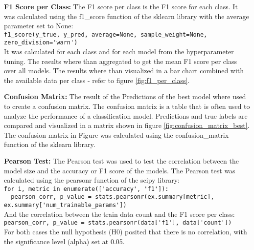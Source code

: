 \textbf{F1 Score per Class:} The F1 score per class is the F1 score for each class. It was calculated
using the f1\_score function of the sklearn library with the average parameter set to None:\\
\lstinline{f1_score(y_true, y_pred, average=None, sample_weight=None, zero_division='warn')}\\
It was calculated for each class and for each model from the hyperparameter tuning. The results
where than aggregated to get the mean F1 score per class over all models. The results where
than visualized in a bar chart combined with the available data per class - refer to
figure \ref{fig:f1_per_class}.

\textbf{Confusion Matrix:} The result of the Predictions of the best model where used to create a confusion matrix.
The confusion matrix is a table that is often used to analyze the performance of a classification model.
Predictions and true labels are compared and visualized in a matrix shown in figure \ref{fig:confusion_matrix_best}. 
The confusion matrix in Figure was calculated using the confusion\_matrix function of the sklearn library.

\textbf{Pearson Test:} The Pearson test was used to test the correlation between the model size and the accuracy
or F1 score of the models. The Pearson test was calculated using the pearsonr function of the scipy library:\\
\lstinline{for i, metric in enumerate(['accuracy', 'f1']):}\\
\lstinline{  pearson_corr, p_value = stats.pearsonr(ex.summary[metric], ex.summary['num_trainable_params'])}\\
And the correlation between the train data count and the F1 score per class:\\
\lstinline{pearson_corr, p_value = stats.pearsonr(data['f1'], data['count'])}\\
For both cases the null hypothesis (H0) posited that there is no correlation, with the significance level (alpha) set at 0.05.




